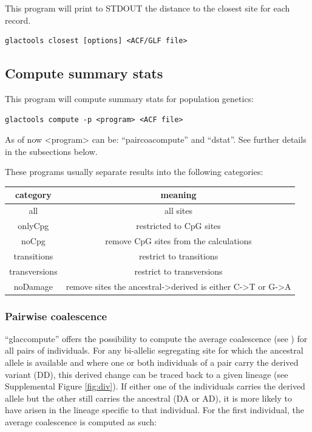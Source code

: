 \documentclass[a4paper]{article}
\begin{document}
\noindent This program will print to STDOUT the distance to the closest site for each record.

\begin{lstlisting}
glactools closest [options] <ACF/GLF file>
\end{lstlisting}






\subsection{Compute summary stats}

\noindent This program will compute summary stats for population genetics:

\begin{lstlisting}
glactools compute -p <program> <ACF file>
\end{lstlisting}

As of now <program> can be: ``paircoacompute'' and ``dstat''. See further details in the subsections below.

These programs usually separate results into the following categories:

\begin{tabular}{c|c}
{\bf category}  & {\bf meaning} \\
\hline
all            &  all sites \\
onlyCpg        & restricted to CpG sites \\
noCpg          & remove CpG sites from the calculations \\
transitions    & restrict to transitions \\
transversions  & restrict to transversions \\
noDamage       & remove sites the ancestral->derived is either C->T or G->A \\
\hline
\end{tabular}



\subsubsection{Pairwise coalescence}

``glaccompute'' offers the possibility to compute the average coalescence (see \cite{prufer2010computational}) for all pairs of individuals. For any bi-allelic segregating site for which the ancestral allele is available and where one or both individuals of a pair carry the derived variant (DD), this derived change can be traced back to a given lineage (see Supplemental Figure \ref{fig:div}). If either one of the individuals carries the derived allele but the other still carries the ancestral (DA or AD), it is more likely to have arisen in the lineage specific to that individual. For the first individual, the average coalescence is computed as such: 
\end{document}
